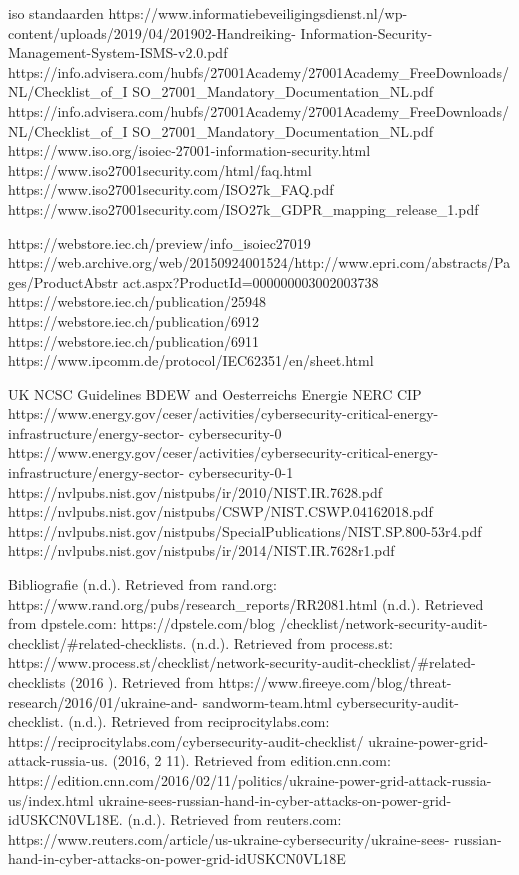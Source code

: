 iso standaarden
https://www.informatiebeveiligingsdienst.nl/wp-content/uploads/2019/04/201902-Handreiking-
Information-Security-Management-System-ISMS-v2.0.pdf
https://info.advisera.com/hubfs/27001Academy/27001Academy_FreeDownloads/NL/Checklist_of_I
SO_27001_Mandatory_Documentation_NL.pdf
https://info.advisera.com/hubfs/27001Academy/27001Academy_FreeDownloads/NL/Checklist_of_I
SO_27001_Mandatory_Documentation_NL.pdf
https://www.iso.org/isoiec-27001-information-security.html
https://www.iso27001security.com/html/faq.html
https://www.iso27001security.com/ISO27k_FAQ.pdf
https://www.iso27001security.com/ISO27k_GDPR_mapping_release_1.pdf

https://webstore.iec.ch/preview/info_isoiec27019%
https://web.archive.org/web/20150924001524/http://www.epri.com/abstracts/Pages/ProductAbstr
act.aspx?ProductId=000000003002003738
https://webstore.iec.ch/publication/25948
https://webstore.iec.ch/publication/6912
https://webstore.iec.ch/publication/6911
https://www.ipcomm.de/protocol/IEC62351/en/sheet.html

UK NCSC Guidelines
BDEW and Oesterreichs Energie
NERC CIP
https://www.energy.gov/ceser/activities/cybersecurity-critical-energy-infrastructure/energy-sector-
cybersecurity-0
https://www.energy.gov/ceser/activities/cybersecurity-critical-energy-infrastructure/energy-sector-
cybersecurity-0-1
https://nvlpubs.nist.gov/nistpubs/ir/2010/NIST.IR.7628.pdf
https://nvlpubs.nist.gov/nistpubs/CSWP/NIST.CSWP.04162018.pdf
https://nvlpubs.nist.gov/nistpubs/SpecialPublications/NIST.SP.800-53r4.pdf
https://nvlpubs.nist.gov/nistpubs/ir/2014/NIST.IR.7628r1.pdf

Bibliografie
(n.d.). Retrieved from rand.org: https://www.rand.org/pubs/research_reports/RR2081.html
(n.d.). Retrieved from dpstele.com: https://dpstele.com/blog%
/checklist/network-security-audit-checklist/#related-checklists. (n.d.). Retrieved from process.st:
https://www.process.st/checklist/network-security-audit-checklist/#related-checklists
(2016 ). Retrieved from https://www.fireeye.com/blog/threat-research/2016/01/ukraine-and-
sandworm-team.html
cybersecurity-audit-checklist. (n.d.). Retrieved from reciprocitylabs.com:
https://reciprocitylabs.com/cybersecurity-audit-checklist/
ukraine-power-grid-attack-russia-us. (2016, 2 11). Retrieved from edition.cnn.com:
https://edition.cnn.com/2016/02/11/politics/ukraine-power-grid-attack-russia-us/index.html
ukraine-sees-russian-hand-in-cyber-attacks-on-power-grid-idUSKCN0VL18E. (n.d.). Retrieved from
reuters.com: https://www.reuters.com/article/us-ukraine-cybersecurity/ukraine-sees-
russian-hand-in-cyber-attacks-on-power-grid-idUSKCN0VL18E


